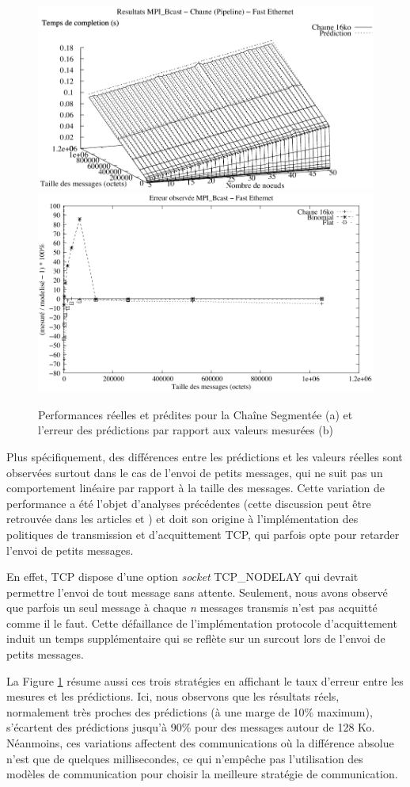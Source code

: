 %
\begin{figure}[h]
	\centering
	\includegraphics[width=0.5\linewidth]{images/modeles/FEth/Bcast/comp_Chain_16384}\includegraphics[width=0.5\linewidth]{images/modeles/FEth/Bcast/error}
	\caption{\label{Figure:Comparison-Bcast-Chain_FEth}Performances réelles
		et prédites pour la Chaîne Segmentée (a)  et l'erreur des prédictions par rapport
		aux valeurs mesurées (b)}
\end{figure}

Plus spécifiquement, des différences entre les prédictions et les
valeurs réelles sont observées surtout dans le cas de l'envoi de petits messages, qui ne suit pas un comportement linéaire
par rapport à la taille des messages. Cette variation de performance
a été l'objet d'analyses précédentes (cette discussion peut être retrouvée
dans les articles \cite{Steffenel04a} et \cite{Steffenel04c}) et doit son origine à l'implémentation des politiques de 
transmission et d'acquittement TCP, qui parfois opte pour retarder l'envoi de petits messages. 

En effet, TCP dispose d'une option \emph{socket} TCP\_NODELAY qui devrait permettre l'envoi de tout message sans attente. 
Seulement, nous avons observé que parfois un seul message
à chaque \emph{n} messages transmis n'est pas acquitté comme il le
faut. Cette défaillance de l'implémentation protocole d'acquittement induit un temps supplémentaire
 qui se reflète sur un surcout lors de l'envoi de petits messages.  


La Figure \ref{Figure:Comparison-Bcast-Chain_FEth} résume aussi ces trois stratégies en affichant le taux d'erreur entre les mesures et les prédictions.
Ici, nous observons que les résultats réels, normalement très proches
des prédictions (à une marge de 10\% maximum), s'écartent des prédictions
jusqu'à 90\% pour des messages autour de 128 Ko. Néanmoins, ces variations
affectent des communications où la différence absolue n'est que de
quelques millisecondes, ce qui n'empêche pas l'utilisation des modèles
de communication pour choisir la meilleure stratégie de communication. 


